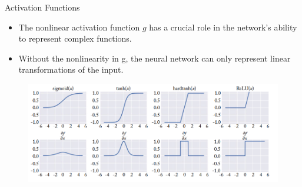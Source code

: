 \begin{frame}{Activation Functions}

\begin{scriptsize}
\begin{itemize}
\item The nonlinear activation function $g$ has a crucial role in the network's ability to represent complex functions. 
\item Without the nonlinearity in g, the neural network can only represent linear transformations of the input.
\end{itemize}


\end{scriptsize}

\begin{figure}[htb]
	\centering
	 \includegraphics[scale=0.24]{pics/activations.png}
\end{figure}


\end{frame}


